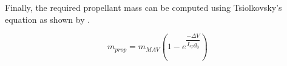 
Finally, the required propellant mass can be computed using Tsiolkovsky's equation as shown by .

\begin{equation} \label{eq:propellantMass}
m_{prop} = m_{MAV}\left(1-e^{\dfrac{-\Delta V}{I_{sp}g_{0}}}\right)
\end{equation}

%

%

